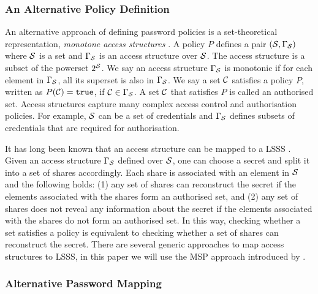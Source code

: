 \subsubsection{An Alternative Policy Definition} \label{sec:lsss}
An alternative approach of defining password policies is a set-theoretical representation, \ie \emph{monotone access structures} \cite{ito89}.
A policy $P$ defines a pair $(\mathcal{S},\Gamma_\mathcal{S})$ where $\mathcal{S}$ is a set and $\Gamma_\mathcal{S}$ is an access structure over $\mathcal{S}$. 
The access structure is a subset of the powerset $2^\mathcal{S}$. 
We say an access structure $\Gamma_\mathcal{S}$ is monotonic if for each element in $\Gamma_\mathcal{S}$, all its superset is also in $\Gamma_\mathcal{S}$. 
We say a set $\mathcal{C}$ satisfies a policy $P$, written as $P(\mathcal{C})=\mathtt{true}$, if $\mathcal{C}\in \Gamma_\mathcal{S}$. 
A set $\mathcal{C}$ that satisfies $P$ is called an authorised set. 
Access structures capture many complex access control and authorisation policies. For example, $\mathcal{S}$ can be a set of credentials and $\Gamma_\mathcal{S}$ defines subsets of credentials that are required for authorisation.

It has long been known that an access structure can be mapped to a \ac{LSSS} \cite{ito89,bei96}. 
Given an access structure $\Gamma_\mathcal{S}$ defined over $\mathcal{S}$, one can choose a secret and split it into a set of shares accordingly. 
Each share is associated with an element in $\mathcal{S}$ and the following holds: 
(1) any set of shares can reconstruct the secret if the elements associated with the shares form an authorised set, and 
(2) any set of shares does not reveal any information about the secret if the elements associated with the shares do not form an authorised set.
In this way, checking whether a set satisfies a policy is equivalent to checking whether a set of shares can reconstruct the secret. 
There are several generic approaches to map access structures to \ac{LSSS}, in this paper we will use the \ac{MSP} approach introduced by \citet{bei96}. 

\subsubsection{Alternative Password Mapping}

